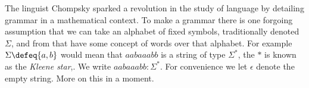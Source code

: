 
The linguist Chompsky sparked a revolution in the study of language by detailing
grammar in a mathematical context.  To make a grammar there is one forgoing
assumption that we can take an alphabet of fixed symbols, traditionally denoted
$\Sigma$, and from that have some concept of words over that alphabet.  For
example $\Sigma\defeq\{a,b\}$ would mean that $aabaaabb$ is a string of type
$\Sigma^*$, the $*$ is known as the \emph{Kleene star},.  We
write $aabaaabb:\Sigma^*$.  For convenience we let $\epsilon$ denote the empty
string.  More on this in a moment.
